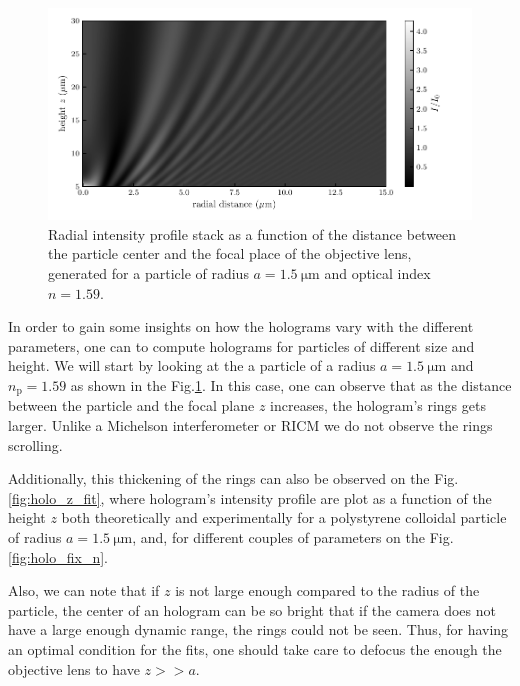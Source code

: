 \begin{figure}[H]
	\centering
	\includegraphics{02_body/chapter2/images/holo_size_exemple/holos_only_z.pdf}
	\caption{Radial intensity profile stack as a function of the distance between the particle center and the focal place of the objective lens, generated for a particle of radius $a = 1.5 ~\mathrm{\mu m}$ and optical index $n = 1.59$.}
	\label{fig:holo_onlyz}
\end{figure}

In order to gain some insights on how the holograms vary with the different parameters, one can to compute holograms for particles of different size and height. We will start by looking at the a particle of a radius $a = 1.5 ~ \mathrm{\mu m} $ and $n_\mathrm{p}= 1.59 $ as shown in the Fig.\ref{fig:holo_onlyz}. In this case, one can observe that as the distance between the particle and the focal plane $z$ increases, the hologram's rings gets larger. Unlike a Michelson interferometer or \gls{RICM} we do not observe the rings scrolling. 

Additionally, this thickening of the rings can also be observed on the Fig.\ref{fig:holo_z_fit}, where hologram's intensity profile are plot as a function of the height $z$ both theoretically and experimentally for a polystyrene colloidal particle of radius  $a = 1.5 ~ \mathrm{\mu m} $, and, for different couples of parameters on the Fig.\ref{fig:holo_fix_n}.

Also, we can note that if $z$ is not large enough compared to the radius of the particle, the center of an hologram can be so bright that if the camera does not have a large enough dynamic range, the rings could not be seen.  Thus, for having an optimal condition for the fits, one should take care to defocus the enough the objective lens to have $z >> a$.

